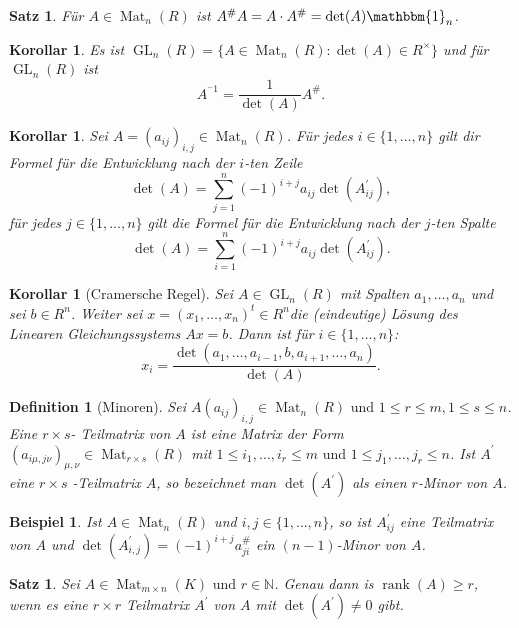 \documentclass[ngerman,a4paper]{report}
\theoremstyle{changebreak}
\newtheorem{example}[theorem]{Beispiel}
\newtheorem{corollar}[theorem]{Korollar}
\newtheorem{satz}[theorem]{Satz}
\newtheorem{definition}[theorem]{Definition}
\newcommand{\highlight}[1]{\emph{#1}}
\DeclareMathOperator{\Mat}{Mat}
\DeclareMathOperator{\GL}{GL}
\DeclareMathOperator{\rk}{rank}
\begin{document}
\begin{satz}
    Für $A\in \Mat_n(R)$ ist $A^{\#}A = A\cdot A^{\#} = \det(A)\mathbbm{1}_n$.
\end{satz}

\begin{corollar}
    Es ist $\GL_n(R) = \{ A \in \Mat_n(R)\colon \det(A) \in R^{\times} \}$ und für $\GL_n(R)$ ist
    \[
    A^{^-1} = \frac{1}{\det(A)}A^{\#}.
    \]
\end{corollar}

\begin{corollar}
    Sei $A=(a_{ij})_{i,j} \in \Mat_n(R)$. Für jedes $i\in\{1,\dots,n\}$ gilt dir Formel für die \highlight{Entwicklung nach der $i$-ten Zeile}
    \[
    \det(A) = \sum_{j=1}^{n}(-1)^{i+j}a_{ij}\det(A_{ij}^{'}),
    \]
    für jedes $j\in\{1,\dots,n\}$ gilt die Formel für die Entwicklung nach der $j$-ten Spalte
    \[
    \det(A) = \sum_{i=1}^{n}(-1)^{i+j}a_{ij}\det(A_{ij}^{'}).
    \]
\end{corollar}

\begin{corollar}[Cramersche Regel]
    Sei $A\in\GL_n(R)$ mit Spalten $a_1,\dots,a_n$ und sei $b \in R^n$. Weiter sei $x=(x_1,\dots,x_n)^t \in R^n$die (eindeutige) Lösung des Linearen Gleichungssystems $Ax=b$.
    Dann ist für $i\in\{1,\dots,n\}$:
    \[
    x_i = \frac{\det(a_1,\dots,a_{i-1},b,a_{i+1},\dots,a_n)}{\det(A)}.
    \]
\end{corollar}

\begin{definition}[Minoren]
    Sei $A(a_{ij})_{i,j}\in \Mat_n(R) \text{ und } 1 \leq r \leq m,1 \leq s \leq n$. Eine \highlight{$r \times s$- Teilmatrix} von $A$ ist eine Matrix der Form $(a_{i\mu,j\nu})_{\mu,\nu} \in \Mat_{r\times s}(R)$ mit $1\leq i_{1}, \dots, i_{r} \leq m \text{ und } 1\leq j_{1}, \dots, j_{r} \leq n$. Ist $A^{'}$ eine $r\times s$      -Teilmatrix $A$, so bezeichnet man $\det(A^{'})$ als einen \highlight{$r$-Minor} von $A$.
\end{definition}

\begin{example}
    Ist $A\in \Mat_n(R)$ und $i,j \in\{1,\dots,n\}$, so ist $A_{ij}^{'}$ eine Teilmatrix von $A$ und $\det(A_{i,j}^{'})=(-1)^{i+j}a_{ji}^{\#}$ ein $(n-1)$-Minor von $A$.
\end{example}

\begin{satz}
    Sei $A\in \Mat_{m\times n}(K) \text{ und } r \in \mathbb{N}$. Genau dann is $\rk(A) \geq r$, wenn es eine $r\times r$ Teilmatrix $A^{'}$ von $A$ mit $\det(A^{'}) \neq 0$ gibt. 
\end{satz}
\end{document}
